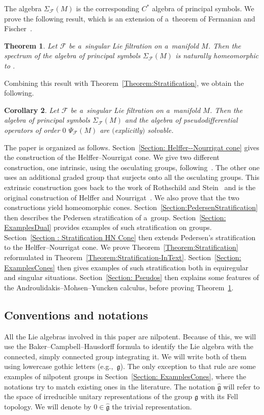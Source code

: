 \documentclass[pdftex]{sigma}
\newcommand{\R}{\mathbb R} %
\newcommand{\F}{\mathcal{F}} %
\newcommand{\g}{\mathfrak{g}} %
\newcommand{\HN}{\operatorname{HN}} %
\newcommand{\Fb}{\mathcal{F}} %
\numberwithin{equation}{section}
\newtheorem{thm}{Theorem}[section]
\newtheorem{cor}[thm]{Corollary}
\theoremstyle{definition}
\begin{document}
The algebra $\Sigma_{\Fb}(M)$ is the corresponding $C^*$ algebra of principal symbols. We prove the following result, which is an extension of a~theorem of Fermanian and Fischer~\cite{FermanianFischerGradedLie}.

\begin{thm}\label{Theorem:SpectrumSymbols}
 Let $\Fb$ be a~singular Lie filtration on a~manifold $M$. Then the spectrum of the algebra of principal symbols $\Sigma_{\Fb}(M)$ is naturally homeomorphic to \smash{${\HN_0(\F)}/{\R^*_+}$}.
\end{thm}

Combining this result with Theorem~\ref{Theorem:Stratification}, we obtain the following.

\begin{cor}\label{Corollary:Solvability}
 Let $\Fb$ be a~singular Lie filtration on a~manifold $M$. Then the algebra of principal symbols $\Sigma_{\Fb}(M)$ and the algebra of pseudodifferential operators of order $0$ $\Psi_{\Fb}(M)$ are $($explicitly$)$ solvable.
\end{cor}

The paper is organized as follows. Section~\ref{Section: Helffer--Nourrigat cone} gives the construction of the Helffer--Nourrigat cone. We give two different construction, one intrinsic, using the osculating groups, following~\cite{AMYMaximalHypoellipticity}. The other one uses an additional graded group that surjects onto all the osculating groups. This extrinsic construction goes back to the work of Rothschild and Stein~\cite{RothschildStein} and is the original construction of Helffer and Nourrigat~\cite{HelfferNourrigatPaper}. We also prove that the two constructions yield homeomorphic cones. Section~\ref{Section:PedersenStratification} then describes the Pedersen stratification of a~group. Section~\ref{Section: ExamplesDual} provides examples of such stratification on groups. Section~\ref{Section : Stratification HN Cone} then extends Pedersen's stratification to the Helffer--Nourrigat cone. We prove Theorem~\ref{Theorem:Stratification} reformulated in Theorem~\ref{Theorem:Stratification-InText}. Section~\ref{Section: ExamplesCones} then gives examples of such stratification both in equiregular and singular situations. Section~\ref{Section: Pseudos} then explains some features of the Androulidakis--Mohsen--Yuncken calculus, before proving Theorem~\ref{Theorem:SpectrumSymbols}.

\subsection*{Conventions and notations} All the Lie algebras involved in this paper are nilpotent. Because of this, we will use the Baker--Campbell--Hausdorff formula to identify the Lie algebra with the connected, simply connected group integrating it. We will write both of them using lowercase gothic letters (e.g.,~$\g$). The only exception to that rule are some examples of nilpotent groups in Section~\ref{Section: ExamplesCones}, where the notations try to match existing ones in the literature. The notation $\widehat{\g}$ will refer to the space of irreducible unitary representations of the group $\g$ with its Fell topology. We will denote by $0 \in \widehat{\g}$ the trivial representation.
\end{document}
